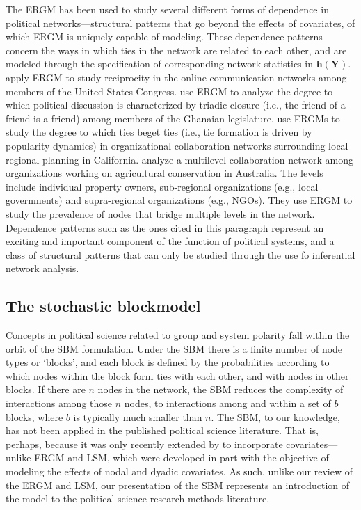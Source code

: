 \documentclass[fleqn,12pt]{wlscirep}
\newcommand{\bh}{\bm{h}}
\begin{document}
The ERGM has been used to study several different forms of dependence in political networks---structural patterns that go beyond the effects of covariates, of which ERGM is uniquely capable of modeling. These dependence patterns concern the ways in which ties in the network are related to each other, and are modeled through the specification of corresponding network statistics in $ \bh(\bm{Y})$. \cite{peng2016follower} apply ERGM to study reciprocity in the online communication networks among members of the United States Congress. \cite{osei2018party} use ERGM to analyze the degree to which political discussion is characterized by triadic closure (i.e., the friend of a friend is a friend) among members of the Ghanaian legislature. \cite{gerber2013political} use ERGMs to study the degree to which ties beget ties (i.e., tie formation is driven by popularity dynamics) in organizational collaboration networks surrounding local regional planning in California. \cite{guerrero2015achieving} analyze a multilevel collaboration network among organizations working on agricultural conservation in Australia.  The levels include individual property owners, sub-regional organizations (e.g., local governments) and supra-regional organizations (e.g., NGOs). They use ERGM to study the prevalence of nodes that bridge multiple levels in the network. Dependence patterns such as the ones cited in this paragraph represent an exciting and important component of the function of political systems, and a class of structural patterns that can only be studied through the use fo inferential network analysis.


\subsection{The stochastic blockmodel}

Concepts in political science related to group  and system polarity \citep[e.g., ][]{baldassarri2007dynamics,cranmer2015kantian} fall within the orbit of the SBM formulation. Under the SBM there is a finite number of node types or `blocks', and each block is defined by the probabilities according to which nodes within the block form ties with each other, and with nodes in other blocks. If there are $n$ nodes in the network, the SBM reduces the complexity of interactions among those $n$  nodes, to interactions among and within a set of $b$ blocks, where $b$ is typically much smaller than $n$. The SBM, to our knowledge, has not been applied in the published political science literature. That is, perhaps, because it was only recently extended by \cite{sweet2015incorporating} to incorporate covariates---unlike ERGM and LSM, which were developed in part with the objective of modeling the effects of nodal and dyadic covariates. As such, unlike our review of the ERGM and LSM, our presentation of the SBM represents an introduction of the model to the political science research methods literature.
\end{document}
